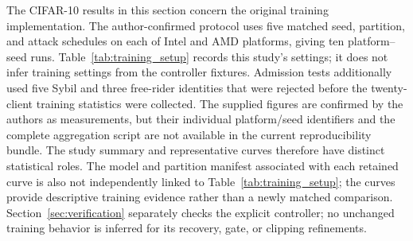 \documentclass[conference,compsoc]{IEEEtran}
\begin{document}
The CIFAR-10 results in this section concern the original training
implementation. The author-confirmed protocol uses five matched seed, partition,
and attack schedules on each of Intel and AMD platforms, giving ten
platform--seed runs. Table~\ref{tab:training_setup} records this study's settings;
it does not infer training settings from the controller fixtures. Admission
tests additionally used five Sybil and three free-rider identities that were
rejected before the twenty-client training statistics were collected.
The supplied figures are confirmed by the authors as measurements, but their
individual platform/seed identifiers and the complete aggregation script are
not available in the current reproducibility bundle. The study summary and
representative curves therefore have distinct statistical roles. The model and
partition manifest associated with each retained curve is also not independently
linked to Table~\ref{tab:training_setup}; the curves provide descriptive
training evidence rather than a newly matched comparison.
Section~\ref{sec:verification} separately checks the explicit controller;
no unchanged training behavior is inferred for its recovery, gate, or clipping
refinements.
\end{document}
